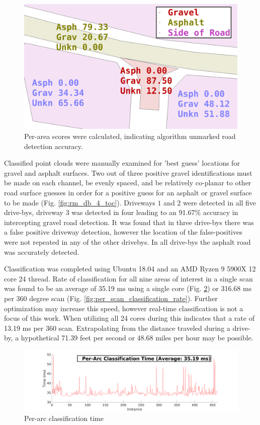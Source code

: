 \documentclass[journal,onecolumn]{IEEEtran}
\begin{document}
		\begin{figure}[H]
			\centering
			\includegraphics[width=0.75\linewidth]{figures/side_of_road_nums_4_with_filts_2_2}
			\caption[Area Scores]{Per-area scores were calculated, indicating algorithm unmarked road detection accuracy. }
			\label{fig:prepostadjust}
		\end{figure}
	
		{Classified point clouds were manually examined for 'best guess' locations for gravel and asphalt surfaces. Two out of three positive gravel identifications must be made on each channel, be evenly spaced, and be relatively co-planar to other road surface guesses in order for a positive guess for an asphalt or gravel surface to be made (Fig. \ref{fig:rm_db_4_toc}). Driveways $1$ and $2$ were detected in all five drive-bys, driveway $3$ was detected in four leading to an 91.67\% accuracy in intercepting gravel road detection. It was found that in three drive-bys there was a false positive driveway detection, however the location of the false-positives were not repeated in any of the other drivebys. In all drive-bys the asphalt road was accurately detected. }
	
		{Classification was completed using Ubuntu 18.04 and an AMD Ryzen 9 5900X 12 core 24 thread. Rate of classification for all nine areas of interest in a single scan was found to be an average of 35.19 ms using a single core (Fig. \ref{fig:per_arc_classification_time}) or 316.68 ms per 360 degree scan (Fig. \ref{fig:per_scan_classification_rate}). Further optimization may increase this speed, however real-time classification is not a focus of this work. When utilizing all 24 cores during this indicates that a rate of 13.19 ms per 360 scan. Extrapolating from the distance traveled during a drive-by, a hypothetical 71.39 feet per second or 48.68 miles per hour may be possible.}
		
		\begin{figure}[H]
			\centering
			\includegraphics[width=0.75\linewidth]{figures/per_arc_classification_time}
			\caption[Per-Arc Time]{Per-arc classification time}
			\label{fig:per_arc_classification_time}
		\end{figure}
		
\end{document}
